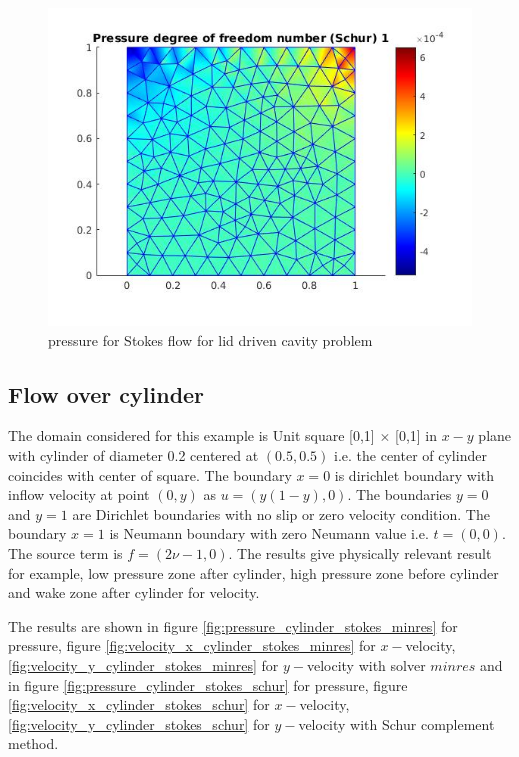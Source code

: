 \documentclass[a4paper,12pt]{book}
\begin{document}
\begin{figure}
  \includegraphics[width=\linewidth]{pressure.jpg}
  \caption{pressure for Stokes flow for lid driven cavity problem}
  \label{fig:pressure_benchmark_stokes}
\end{figure}

\subsection{Flow over cylinder}

The domain considered for this example is Unit square [0,1] $\times$ [0,1] in $x-y$ plane with cylinder of diameter 0.2 centered at $(0.5,0.5)$ i.e. the center of cylinder coincides with center of square. The boundary ${x=0}$ is dirichlet boundary with inflow velocity at point $(0,y)$ as $u = (y(1-y), 0)$. The boundaries ${y = 0}$ and ${y = 1}$ are Dirichlet boundaries with no slip or zero velocity condition. The boundary ${x = 1}$ is Neumann boundary with zero Neumann value i.e. $t = (0, 0)$. The source term is $f = (2 \nu - 1, 0)$. The results give physically relevant result for example, low pressure zone after cylinder, high pressure zone before cylinder and wake zone after cylinder for velocity.

The results are shown in figure \ref{fig:pressure_cylinder_stokes_minres} for pressure, figure \ref{fig:velocity_x_cylinder_stokes_minres} for $x-$velocity, \ref{fig:velocity_y_cylinder_stokes_minres} for $y-$velocity with solver $minres$ and in figure \ref{fig:pressure_cylinder_stokes_schur} for pressure, figure \ref{fig:velocity_x_cylinder_stokes_schur} for $x-$velocity, \ref{fig:velocity_y_cylinder_stokes_schur} for $y-$velocity with Schur complement method.
\end{document}
